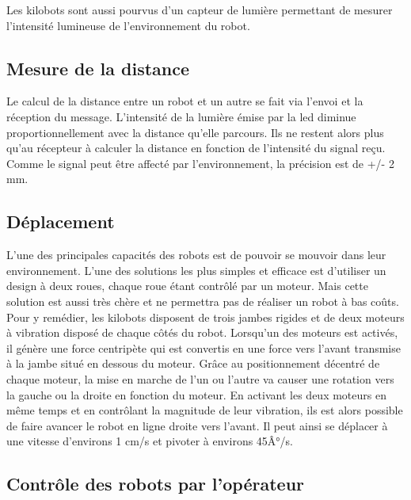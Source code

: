 \documentclass[a4paper,8pt]{report}
\begin{document}
\medskip
Les kilobots sont aussi pourvus d'un capteur de lumi\`ere permettant de mesurer l'intensit\'e lumineuse de l'environnement du robot.\\

\subsection*{Mesure de la distance}\label{subsec:name}

Le calcul de la distance entre un robot et un autre se fait via l'envoi et la r\'eception du message. L'intensit\'e de la lumi\`ere \'emise par la led diminue proportionnellement avec la distance qu'elle parcours. Ils ne restent alors plus qu'au r\'ecepteur \`a calculer la distance en fonction de l'intensit\'e du signal re\c cu. Comme le signal peut \^etre affect\'e par l'environnement, la pr\'ecision est de +/- 2 mm.\\

\subsection*{D\'eplacement}\label{subsec:name}

L'une des principales capacit\'es des robots est de pouvoir se mouvoir dans leur environnement. L'une des solutions les plus simples et efficace est d'utiliser un design \`a deux roues, chaque roue \'etant contr\^ol\'e par un moteur. Mais cette solution est aussi tr\`es ch\`ere et ne permettra pas de r\'ealiser un robot \`a bas co\^uts. \\
Pour y rem\'edier, les kilobots disposent de trois jambes rigides et de deux moteurs \`a vibration dispos\'e de chaque c\^ot\'es du robot. Lorsqu'un des moteurs est activ\'es, il g\'en\`ere une force centrip\`ete qui est convertis en une force vers l'avant transmise \`a la jambe situ\'e en dessous du moteur. Gr\^ace au positionnement d\'ecentr\'e de chaque moteur, la mise en marche de l'un ou l'autre va causer une rotation vers la gauche ou la droite en fonction du moteur. En activant les deux moteurs en m\^eme temps et en contr\^olant la magnitude de leur vibration, ils est alors possible de faire avancer le robot en ligne droite vers l'avant. Il peut ainsi se d\'eplacer \`a une vitesse d'environs 1 cm/s et pivoter \`a environs 45Â°/s.\\

\subsection*{Contr\^ole des robots par l'op\'erateur}\label{subsec:name}
\end{document}

